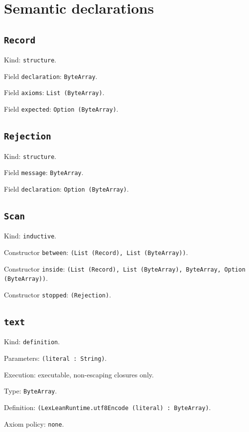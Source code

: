 \documentclass[11pt]{article}
\begin{document}
\section*{Semantic declarations}
\subsection*{\texttt{Record}}
\noindent Kind: \texttt{structure}.\par
\noindent Field \texttt{declaration}: \texttt{ByteArray}.\par
\noindent Field \texttt{axioms}: \texttt{List (ByteArray)}.\par
\noindent Field \texttt{expected}: \texttt{Option (ByteArray)}.\par
\subsection*{\texttt{Rejection}}
\noindent Kind: \texttt{structure}.\par
\noindent Field \texttt{message}: \texttt{ByteArray}.\par
\noindent Field \texttt{declaration}: \texttt{Option (ByteArray)}.\par
\subsection*{\texttt{Scan}}
\noindent Kind: \texttt{inductive}.\par
\noindent Constructor \texttt{between}: \texttt{(List (Record), List (ByteArray))}.\par
\noindent Constructor \texttt{inside}: \texttt{(List (Record), List (ByteArray), ByteArray, Option (ByteArray))}.\par
\noindent Constructor \texttt{stopped}: \texttt{(Rejection)}.\par
\subsection*{\texttt{text}}
\noindent Kind: \texttt{definition}.\par
\noindent Parameters: \texttt{(literal : String)}.\par
\noindent Execution: executable, non-escaping closures only.\par
\noindent Type: \texttt{ByteArray}.\par
\noindent Definition: \texttt{(LexLeanRuntime.utf8Encode (literal) : ByteArray)}.\par
\noindent Axiom policy: \texttt{none}.\par
\end{document}

